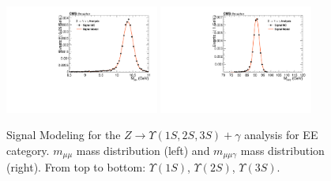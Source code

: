 \begin{figure}[!htbp]
\begin{center}
\includegraphics[width=0.45\textwidth]{figures/fitPlotFiles2D/ZToUpsilonPhotonSignalAndBackgroundFit/mMuMNU_ZToUpsilon3SPhotonSignalAndBackgroundFit_Signal_Cat3}\hspace*{1.cm}
\includegraphics[width=0.45\textwidth]{figures/fitPlotFiles2D/ZToUpsilonPhotonSignalAndBackgroundFit/mHZ_ZToUpsilon3SPhotonSignalAndBackgroundFit_Signal_Cat3_default}\hspace*{1.cm}


\end{center}\vspace*{-.5cm}
\caption{Signal Modeling for the $Z \rightarrow \Upsilon(1S,2S,3S) +\gamma$ analysis for EE category. $m_{\mu\mu}$ mass distribution (left) and $m_{\mu\mu\gamma}$ mass distribution (right). From top to bottom: $\Upsilon(1S)$, $\Upsilon(2S)$, $\Upsilon(3S)$.}
\label{fig:ZToUpsilon_Signal_Cat3}
\end{figure}

